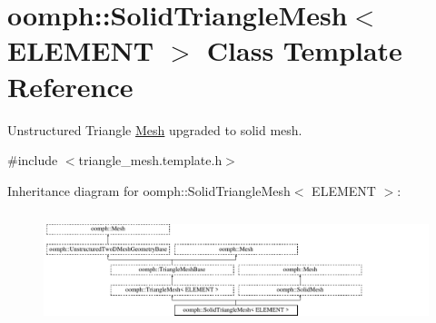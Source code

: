 \hypertarget{classoomph_1_1SolidTriangleMesh}{}\section{oomph\+:\+:Solid\+Triangle\+Mesh$<$ E\+L\+E\+M\+E\+NT $>$ Class Template Reference}
\label{classoomph_1_1SolidTriangleMesh}


Unstructured Triangle \hyperlink{classoomph_1_1Mesh}{Mesh} upgraded to solid mesh.  




{\ttfamily \#include $<$triangle\+\_\+mesh.\+template.\+h$>$}

Inheritance diagram for oomph\+:\+:Solid\+Triangle\+Mesh$<$ E\+L\+E\+M\+E\+NT $>$\+:\begin{figure}[H]
\begin{center}
\leavevmode
\includegraphics[height=3.333333cm]{classoomph_1_1SolidTriangleMesh}
\end{center}
\end{figure}
